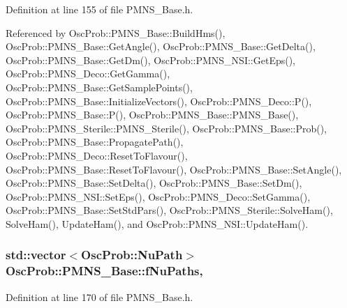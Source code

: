Definition at line 155 of file P\+M\+N\+S\+\_\+\+Base.\+h.



Referenced by Osc\+Prob\+::\+P\+M\+N\+S\+\_\+\+Base\+::\+Build\+Hms(), Osc\+Prob\+::\+P\+M\+N\+S\+\_\+\+Base\+::\+Get\+Angle(), Osc\+Prob\+::\+P\+M\+N\+S\+\_\+\+Base\+::\+Get\+Delta(), Osc\+Prob\+::\+P\+M\+N\+S\+\_\+\+Base\+::\+Get\+Dm(), Osc\+Prob\+::\+P\+M\+N\+S\+\_\+\+N\+S\+I\+::\+Get\+Eps(), Osc\+Prob\+::\+P\+M\+N\+S\+\_\+\+Deco\+::\+Get\+Gamma(), Osc\+Prob\+::\+P\+M\+N\+S\+\_\+\+Base\+::\+Get\+Sample\+Points(), Osc\+Prob\+::\+P\+M\+N\+S\+\_\+\+Base\+::\+Initialize\+Vectors(), Osc\+Prob\+::\+P\+M\+N\+S\+\_\+\+Deco\+::\+P(), Osc\+Prob\+::\+P\+M\+N\+S\+\_\+\+Base\+::\+P(), Osc\+Prob\+::\+P\+M\+N\+S\+\_\+\+Base\+::\+P\+M\+N\+S\+\_\+\+Base(), Osc\+Prob\+::\+P\+M\+N\+S\+\_\+\+Sterile\+::\+P\+M\+N\+S\+\_\+\+Sterile(), Osc\+Prob\+::\+P\+M\+N\+S\+\_\+\+Base\+::\+Prob(), Osc\+Prob\+::\+P\+M\+N\+S\+\_\+\+Base\+::\+Propagate\+Path(), Osc\+Prob\+::\+P\+M\+N\+S\+\_\+\+Deco\+::\+Reset\+To\+Flavour(), Osc\+Prob\+::\+P\+M\+N\+S\+\_\+\+Base\+::\+Reset\+To\+Flavour(), Osc\+Prob\+::\+P\+M\+N\+S\+\_\+\+Base\+::\+Set\+Angle(), Osc\+Prob\+::\+P\+M\+N\+S\+\_\+\+Base\+::\+Set\+Delta(), Osc\+Prob\+::\+P\+M\+N\+S\+\_\+\+Base\+::\+Set\+Dm(), Osc\+Prob\+::\+P\+M\+N\+S\+\_\+\+N\+S\+I\+::\+Set\+Eps(), Osc\+Prob\+::\+P\+M\+N\+S\+\_\+\+Deco\+::\+Set\+Gamma(), Osc\+Prob\+::\+P\+M\+N\+S\+\_\+\+Base\+::\+Set\+Std\+Pars(), Osc\+Prob\+::\+P\+M\+N\+S\+\_\+\+Sterile\+::\+Solve\+Ham(), Solve\+Ham(), Update\+Ham(), and Osc\+Prob\+::\+P\+M\+N\+S\+\_\+\+N\+S\+I\+::\+Update\+Ham().

\subsubsection[{\texorpdfstring{f\+Nu\+Paths}{fNuPaths}}]{\setlength{\rightskip}{0pt plus 5cm}std\+::vector$<${\bf Osc\+Prob\+::\+Nu\+Path}$>$ Osc\+Prob\+::\+P\+M\+N\+S\+\_\+\+Base\+::f\+Nu\+Paths\hspace{0.3cm}{\ttfamily [protected]}, {\ttfamily [inherited]}}\hypertarget{classOscProb_1_1PMNS__Base_a69db9d57e12fc7cbe0431bc6c18fac93}{}\label{classOscProb_1_1PMNS__Base_a69db9d57e12fc7cbe0431bc6c18fac93}


Definition at line 170 of file P\+M\+N\+S\+\_\+\+Base.\+h.



